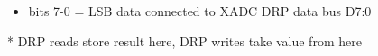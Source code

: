 \begin{itemize}
\item bits 7-0 = LSB data connected to XADC DRP data bus D7:0
\end{itemize}
* DRP reads store result here, DRP writes take value from here

